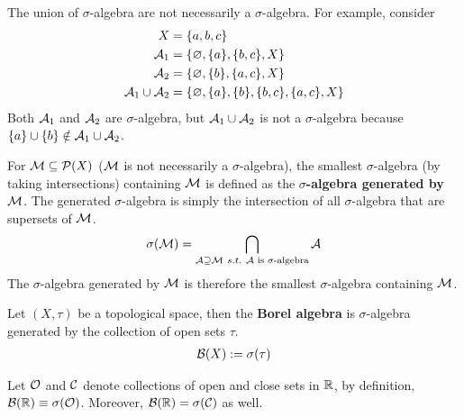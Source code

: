 \documentclass[11pt]{article}
\numberwithin{equation}{section}
\newcommand{\s}[0]{$\sigma$}
\begin{document}
	\begin{remark}
		The union of \s-algebra are not necessarily a \s-algebra. For example, consider
		\begin{align}
			X &= \{a, b, c\} \\
			\mathcal{{A}}_1 &= \{\varnothing, \{a\}, \{b, c\}, X\} \\
			\mathcal{{A}}_2 &= \{\varnothing, \{b\}, \{a, c\}, X\} \\
			\mathcal{{A}}_1 \cup \mathcal{{A}}_2 &= \{\varnothing, \{a\}, \{b\}, \{b, c\}, \{a, c\}, X\}
		\end{align}
		Both $\mathcal{{A}}_1$ and $\mathcal{{A}}_2$ are \s-algebra, but $\mathcal{{A}}_1 \cup \mathcal{{A}}_2$ is not a \s-algebra because $\{a\} \cup \{b\} \notin \mathcal{{A}}_1 \cup \mathcal{{A}}_2$.
	\end{remark}
	
	\begin{definition}
		For $\mathcal{{M}} \subseteq \mathcal{{P}}(X)$ ($\mathcal{{M}}$ is not necessarily a $\sigma$-algebra), the smallest $\sigma$-algebra (by taking intersections) containing $\mathcal{{M}}$ is defined as the \textbf{$\sigma$-algebra generated by $\mathcal{{M}}$}.
		The generated $\sigma$-algebra is simply the intersection of all $\sigma$-algebra that are supersets of $\mathcal{{M}}$.
		\begin{align}
			\sigma(\mc{M}) = \bigcap_{\mc{A} \supseteq \mc{M}\ s.t.\ \mc{A}\tx{ is $\sigma$-algebra}} \mc{A}
		\end{align}
		The \s-algebra generated by $\mathcal{{M}}$ is therefore the smallest \s-algebra containing $\mathcal{{M}}$.
	\end{definition}
	
	\begin{definition}
		Let $(X, \tau)$ be a topological space, then the \textbf{Borel algebra} is $\sigma$-algebra generated by the collection of open sets $\tau$.
		\begin{align}
			\mathcal{{B}}(X) := \sigma(\tau)
		\end{align}
	\end{definition}
	
	\begin{theorem}\label{thm:a}
        Let $\mathcal{{O}}$ and $\mathcal{{C}}$ denote collections of open and close sets in $\mathbb{R}$, by definition, $\mathcal{{B}}(\mathbb{R}) \equiv \sigma(\mathcal{{O}})$. Moreover, $\mathcal{{B}}(\mathbb{R}) = \sigma(\mathcal{{C}})$ as well.
    \end{theorem}
    
\end{document}
